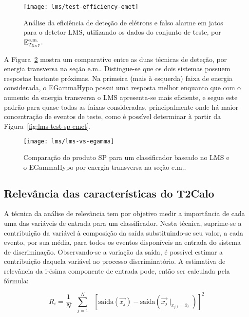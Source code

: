 \begin{figure}
\begin{center}
\texttt{[image: lms/test-efficiency-emet]}
\end{center}
\caption{Análise da eficiência de deteção de elétrons e falso alarme em jatos
para o detetor LMS, utilizando os dados do conjunto de teste, por $\text{E}^{\text{e.m.}}_{T_{3\times7}}$.}
\label{fig:lms-test-efficiency-emet}
\end{figure}

A Figura~\ref{fig:lms-vs-egamma} mostra um comparativo entre as duas técnicas
de deteção, por energia transversa na seção e.m.. Distingue-se que os dois
sistemas possuem respostas bastante próximas. Na primeira (mais à esquerda)
faixa de energia considerada, o EGammaHypo possui uma resposta melhor enquanto
que com o aumento da energia transversa o LMS apresenta-se mais eficiente, e
segue este padrão para quase todas as faixas consideradas, principalmente onde
há maior concentração de eventos de teste, como é possível determinar à partir
da Figura~\ref{fig:lms-test-sp-emet}.

\begin{figure}
\begin{center}
\texttt{[image: lms/lms-vs-egamma]}
\end{center}
\caption{Comparação do produto SP para um classificador baseado no LMS e o
EGammaHypo por energia transversa na seção e.m..}
\label{fig:lms-vs-egamma}
\end{figure}

\subsection{Relevância das características do T2Calo}

A técnica da análise de relevância \cite{relevance} tem por objetivo medir a
importância de cada uma das variáveis de entrada para um classificador. Nesta
técnica, suprime-se a contribuição da variável à composição da saída
substituindo-se seu valor, a cada evento, por sua média, para todos os eventos
disponíveis na entrada do sistema de discriminação. Observando-se a variação
da saída, é possível estimar a contribuição daquela variável ao processo
discriminatório. A estimativa de relevância da i-ésima componente de entrada
pode, então ser calculada pela fórmula:

\begin{equation}
R_i = \frac{1}{N} \text{ } \overset{N}{\underset{j=1}{\sum}} \text{ }
[\text{saída}(\overrightarrow{x_j}) -
\text{saída}(\overrightarrow{x_j}\mid_{x_{j,i} = \overline{x}_i})]^2 
\label{eq:relevance-mse}
\end{equation}

